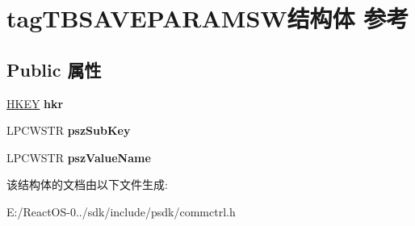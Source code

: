 \hypertarget{structtag_t_b_s_a_v_e_p_a_r_a_m_s_w}{}\section{tag\+T\+B\+S\+A\+V\+E\+P\+A\+R\+A\+M\+S\+W结构体 参考}
\label{structtag_t_b_s_a_v_e_p_a_r_a_m_s_w}
\subsection*{Public 属性}
\begin{DoxyCompactItemize}
\item 
\mbox{\label{structtag_t_b_s_a_v_e_p_a_r_a_m_s_w_ab314394f08692ce81fb44ba42e4958b2}} 
\hyperlink{interfacevoid}{H\+K\+EY} {\bfseries hkr}
\item 
\mbox{\label{structtag_t_b_s_a_v_e_p_a_r_a_m_s_w_a69f794c092a1c0720fd5e23342b6099d}} 
L\+P\+C\+W\+S\+TR {\bfseries psz\+Sub\+Key}
\item 
\mbox{\label{structtag_t_b_s_a_v_e_p_a_r_a_m_s_w_a78fc03a5fc68cac20cdfcc0adcc4e618}} 
L\+P\+C\+W\+S\+TR {\bfseries psz\+Value\+Name}
\end{DoxyCompactItemize}


该结构体的文档由以下文件生成\+:\begin{DoxyCompactItemize}
\item 
E\+:/\+React\+O\+S-\/0../sdk/include/psdk/commctrl.\+h\end{DoxyCompactItemize}

